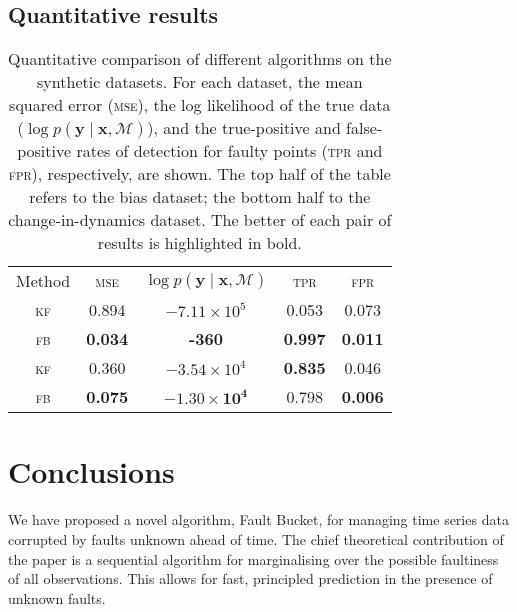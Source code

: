 \documentclass{article}
\newcommand{\given}{\ensuremath{\mid}}
\newcommand{\cm}[1]{\ensuremath{\mathcal{#1}}}
\newcommand{\bm}[1]{\ensuremath{\mathbf{#1}}}
\begin{document}
\subsection{Quantitative results}
\begin{table}
  \centering
  \caption{Quantitative comparison of different algorithms on the
    synthetic datasets.  For each dataset, the mean squared error
    (\textsc{mse}), the log likelihood of the true data ($\log p(\bm{y}
    \given \bm{x}, \cm{M})$), and the true-positive and false-positive rates
    of detection for faulty points (\textsc{tpr} and \textsc{fpr}),
    respectively, are shown.  The top half of the table refers to the
    bias dataset; the bottom half to the change-in-dynamics
    dataset. The better of each pair of results is highlighted in
    bold.}
  \label{tbl:results}
  \begin{tabular}{ccccc}
    \toprule
    Method & \scshape{mse} & $\log p(\bm{y} \given \bm{x}, \cm{M})$ & \scshape{tpr} & \scshape{fpr} \\
    \cmidrule{1-1} \cmidrule(l){2-5} 
    \scshape{kf} & 0.894 & $-7.11 \times 10^5$ & 0.053 & 0.073 \\
    \scshape{fb} & \textbf{0.034} & \textbf{-360} & \textbf{0.997} & \textbf{0.011} \\
    \midrule
    \scshape{kf} & 0.360 & $-3.54 \times 10^4$ & \textbf{0.835} & 0.046 \\
    \scshape{fb} & \textbf{0.075} & $\mathbf{-1.30 \times 10^4}$ & 0.798 & \textbf{0.006} \\
    \bottomrule
  \end{tabular}
\end{table}

\section{Conclusions}
We have proposed a novel algorithm, Fault Bucket, for managing time
series data corrupted by faults unknown ahead of time. The chief
theoretical contribution of the paper is a sequential algorithm for
marginalising over the possible faultiness of all observations. This
allows for fast, principled prediction in the presence of unknown
faults.



\end{document}
